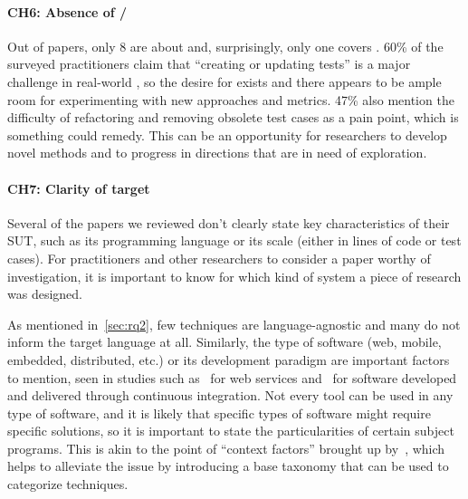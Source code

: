
\paragraph{CH6: Absence of \tsr/\tsa}
Out of \numpapers papers, only 8 are about \tsr and, surprisingly, only one covers \tsa 
 .
60\% of the surveyed practitioners claim that ``creating or updating tests'' is a major challenge in real-world \rt, so the desire for \tsa exists and there appears to be ample room for experimenting with new approaches and metrics.
47\% also mention the difficulty of refactoring and removing obsolete test cases as a pain point, which is something \tsr could remedy.
This can be an opportunity for researchers to develop novel methods and to progress in directions that are in need of exploration.

\paragraph{CH7: Clarity of target}
Several of the papers we reviewed don't clearly state key characteristics of their SUT, such as its programming language or its scale (either in lines of code or test cases).
For practitioners and other researchers to consider a paper worthy of investigation, it is important to know for which kind of system a piece of research was designed.

As mentioned in~\autoref{sec:rq2}, few \rt techniques are language-agnostic and many do not inform the target language at all.
Similarly, the type of software (web, mobile, embedded, distributed, etc.) or its development paradigm are important factors to mention, seen in studies such as~ for web services and~ for software developed and delivered through continuous integration.
Not every tool can be used in any type of software, and it is likely that specific types of software might require specific solutions, so it is important to state the particularities of certain subject programs.
This is akin to the point of ``context factors'' brought up by~\citet{bin_ali_search_2019}, which helps to alleviate the issue by introducing a base taxonomy that can be used to categorize techniques.

